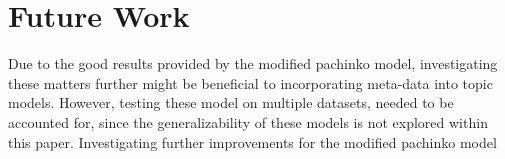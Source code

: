 \section{Future Work}\label{sec:future_work}
Due to the good results provided by the modified pachinko model, investigating these matters further might be beneficial to incorporating meta-data into topic models.
However, testing these model on multiple datasets, needed to be accounted for, since the generalizability of these models is not explored within this paper.
Investigating further improvements for the modified pachinko model  
